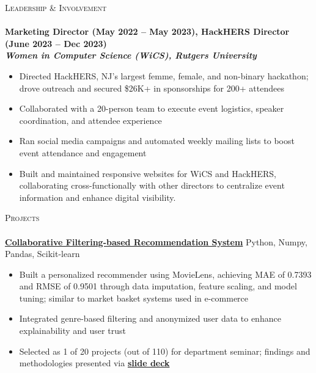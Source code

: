 \documentclass[a4paper]{article}
\newcommand{\lineunder} {
    \vspace*{-8pt} \\
    \hspace*{-18pt} \hrulefill \\
}
\newcommand{\header} [1] {
    {\hspace*{-18pt}\vspace*{6pt} \textsc{#1}}
    \vspace*{-6pt} \lineunder
}
\begin{document}
%
%
\header{Leadership \& Involvement}
\textbf{Marketing Director (May 2022 – May 2023), HackHERS Director (June 2023 – Dec 2023)} \\
\textit{\textbf{Women in Computer Science (WiCS), Rutgers University}}
\vspace{-2.5mm}
\begin{itemize} \itemsep -4pt
  \item Directed HackHERS, NJ’s largest femme, female, and non-binary hackathon; drove outreach and secured \$26K+ in sponsorships for 200+ attendees
  \item Collaborated with a 20-person team to execute event logistics, speaker coordination, and attendee experience
  \item Ran social media campaigns and automated weekly mailing lists to boost event attendance and engagement
  \item Built and maintained responsive websites for WiCS and HackHERS, collaborating cross-functionally with other directors to centralize event information and enhance digital visibility.
\end{itemize}
\vspace{-2mm}

%
%
\header{Projects}

\textbf{\href{https://github.com/ShatakshiRanjan/Recommendation-systems}{Collaborative Filtering-based Recommendation System}} \hfill Python, Numpy, Pandas, Scikit-learn
\vspace{-2.5mm}
\begin{itemize} \itemsep -4pt
\item Built a personalized recommender using MovieLens, achieving MAE of 0.7393 and RMSE of 0.9501 through data imputation, feature scaling, and model tuning; similar to market basket systems used in e-commerce
\item Integrated genre-based filtering and anonymized user data to enhance explainability and user trust
\item Selected as 1 of 20 projects (out of 110) for department seminar; findings and methodologies presented via \textbf{\href{https://docs.google.com/presentation/d/1r65Cy6-eKkuGI6xonAQxm5vqnZ0_YV5kaQh9pkjvJF0/edit?usp=sharing}{slide deck}}
\end{itemize}
\vspace{-1mm}
\end{document}
